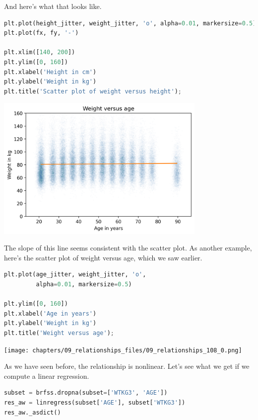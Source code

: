 And here's what that looks like.

\begin{lstlisting}[language=Python,style=source]
plt.plot(height_jitter, weight_jitter, 'o', alpha=0.01, markersize=0.5)
plt.plot(fx, fy, '-')

plt.xlim([140, 200])
plt.ylim([0, 160])
plt.xlabel('Height in cm')
plt.ylabel('Weight in kg')
plt.title('Scatter plot of weight versus height');
\end{lstlisting}

\begin{center}
\includegraphics[width=4in]{chapters/09_relationships_files/09_relationships_106_0.png}
\end{center}

The slope of this line seems consistent with the scatter plot. As
another example, here's the scatter plot of weight versus age, which we
saw earlier.

\begin{lstlisting}[language=Python,style=source]
plt.plot(age_jitter, weight_jitter, 'o', 
         alpha=0.01, markersize=0.5)

plt.ylim([0, 160])
plt.xlabel('Age in years')
plt.ylabel('Weight in kg')
plt.title('Weight versus age');
\end{lstlisting}

\begin{center}
\texttt{[image: chapters/09\_relationships\_files/09\_relationships\_108\_0.png]}
\end{center}

As we have seen before, the relationship is nonlinear. Let's see what we
get if we compute a linear regression.

\begin{lstlisting}[language=Python,style=source]
subset = brfss.dropna(subset=['WTKG3', 'AGE']) 
res_aw = linregress(subset['AGE'], subset['WTKG3'])
res_aw._asdict()
\end{lstlisting}

